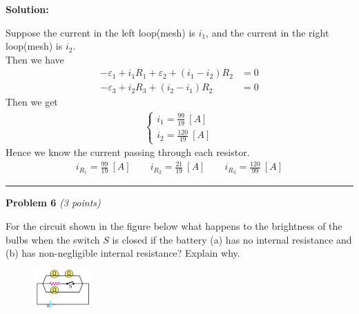 \documentclass[a4paper, 11pt]{article}
\newenvironment{problem}[3][Problem]
    { \begin{mdframed}[backgroundcolor=gray!20] \textbf{#1 #2} \textit{(#3 points)} }
    {  \end{mdframed}}
\newenvironment{solution}
    {\textbf{Solution:}}
    {}
\begin{document}
\begin{solution}
	\par Suppose the current in the left loop(mesh) is $i_1$, and the current in the right loop(mesh) is $i_2$. \\
	Then we have
	\begin{align}
		-\varepsilon_1 + i_1R_1 + \varepsilon_2 + (i_1-i_2)R_2 & = 0 \\
		-\varepsilon_3 + i_2R_3 + (i_2-i_1)R_2                  & = 0
	\end{align}
	Then we get
	\begin{align}
		\left\{
		\begin{array}{c}
			i_1 = \frac{99}{19}\ [A] \\
			i_2 = \frac{120}{19}\ [A]
		\end{array}
		\right.
	\end{align}
	Hence we know the current passing through each resistor.
	\begin{align}
		i_{R_1} = \frac{99}{19}\ [A] \qquad i_{R_2} = \frac{21}{19}\ [A] \qquad i_{R_3} = \frac{120}{99}\ [A]
	\end{align}
\end{solution}

\noindent\rule{7.1in}{2.8pt}

\begin{problem}{6}{3}
\par For the circuit shown in the figure below what happens to the brightness
of the bulbs when the switch $S$ is closed if the battery (a) has no internal
resistance and (b) has non-negligible internal resistance? Explain why.
\end{problem}
\begin{figure}[!htbp]
	\begin{small}
		\begin{center}
			\includegraphics[width=0.2\textwidth]{hw5_p6_question.png}
		\end{center}
	\end{small}
\end{figure}
\end{document}

